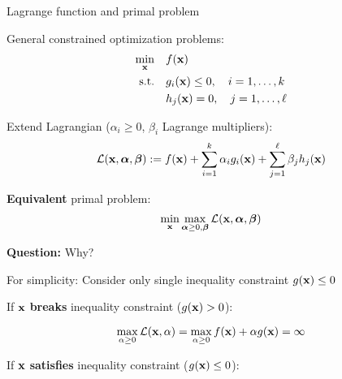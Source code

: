 \documentclass[11pt,compress,t,notes=noshow, xcolor=table]{beamer}
\begin{document}





\begin{vbframe}{Lagrange function and primal problem}

General constrained optimization problems:
\begin{align*}
    \min_{\mathbf{x}} \quad& f(\mathbf{x}) \\
    \text{s.t.} \quad& g_i(\mathbf{x}) \leq 0, \quad i = 1, \ldots ,k \\
    & h_j(\mathbf{x}) = 0, \quad j = 1, \ldots, \ell
\end{align*}

Extend Lagrangian ($\alpha_i\ge 0$, $\beta_i$ Lagrange multipliers):
\begin{equation*}
    \mathcal{L}(\mathbf{x}, \bm{\alpha}, \bm{\beta}) := f(\mathbf{x}) + \sum_{i=1}^k \alpha_i g_i(\mathbf{x}) + \sum_{j=1}^\ell \beta_j h_j(\mathbf{x})
\end{equation*}

\textbf{Equivalent} primal problem:
\begin{equation*}
    \min_{\mathbf{x}} \max_{\bm{\alpha}\ge 0, \bm{\beta}}  \mathcal{L}(\mathbf{x}, \bm{\alpha}, \bm{\beta})
\end{equation*}

\textbf{Question:} Why?

\framebreak

For simplicity: Consider only single inequality constraint $g(\mathbf{x}) \leq 0$

\vspace*{0.2cm} 

If $\mathbf{x}$ \textbf{breaks} inequality constraint ($g(\mathbf{x}) > 0$):

\begin{equation*}
	\max_{\alpha \ge 0} \mathcal{L}(\mathbf{x}, \alpha) = \max_{\alpha \ge 0} f(\mathbf{x}) +  \alpha g(\mathbf{x}) = \infty
\end{equation*}

If $\mathbf{x}$ \textbf{satisfies} inequality constraint ($g(\mathbf{x}) \le 0$):


\end{vbframe}
\end{document}
